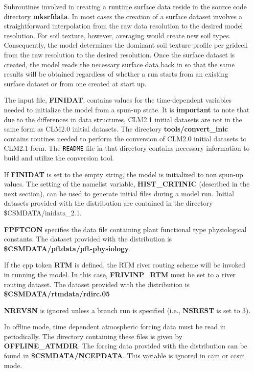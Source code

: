 Subroutines involved in creating a runtime surface data reside in the
source code directory {\bf mksrfdata}. In most cases the creation of a
surface dataset involves a straightforward interpolation from the raw
data resolution to the desired model resolution. For soil texture,
however, averaging would create new soil types. Consequently, the
model determines the dominant soil texture profile per gridcell from
the raw resolution to the desired resolution. Once the surface dataset
is created, the model reads the necessary surface data back in so that
the same results will be obtained regardless of whether a run starts
from an existing surface dataset or from one created at start up.

The input file, {\bf FINIDAT}, contains values for the time-dependent
variables needed to initialize the model from a spun-up state. It is
{\bf important} to note that due to the differences in data
structures, CLM2.1 initial datasets are not in the same form as CLM2.0
initial datasets. The directory {\bf tools/convert\_inic} contains
routines needed to perform the conversion of CLM2.0 initial datasets
to CLM2.1 form. The {\tt README} file in that directory contains
necessary information to build and utilize the conversion tool.

If {\bf FINIDAT} is set to the empty string, the model is initialized
to non spun-up values. The setting of the namelist variable, {\bf
HIST\_CRTINIC} (described in the next section), can be used to
generate initial files during a model run.  Initial datasets provided
with the distribution are contained in the directory
\$CSMDATA/inidata\_2.1.

{\bf FPFTCON} specifies the data file containing plant functional type
physiological constants. The dataset provided with the distribution is
{\bf \$CSMDATA/pftdata/pft-physiology}.

If the cpp token {\bf RTM} is defined, the RTM river routing scheme
will be invoked in running the model. In this case, {\bf FRIVINP\_RTM}
must be set to a river routing dataset. The dataset provided with the
distribution is {\bf \$CSMDATA/rtmdata/rdirc.05}

{\bf NREVSN} is ignored unless a branch run is specified (i.e., {\bf
NSREST} is set to 3).

In offline mode, time dependent atmospheric forcing data must be read
in periodically. The directory containing these files is given by {\bf
OFFLINE\_ATMDIR}. The forcing data provided with the distribution can
be found in {\bf \$CSMDATA/NCEPDATA}. This variable is ignored
in cam or ccsm mode.

